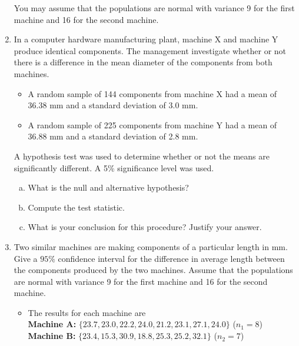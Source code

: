 \documentclass[]{article}
\begin{document}
\begin{enumerate}
You may assume that the populations are normal with variance 9 for the first machine and 16 for
the second machine.

\item 
In a computer hardware manufacturing plant, machine X and machine Y
produce identical components. The management investigate whether or
not there is a difference in the mean diameter of the components from
both machines.
\begin{itemize}
\item A random sample of 144 components from machine X had a mean of
36.38 mm and a standard deviation of 3.0 mm.
\item  A random sample of 225 components from machine Y had a mean of
36.88 mm and a standard deviation of 2.8 mm.
\end{itemize}
A hypothesis test was used to determine whether or not the means are
significantly different. A 5\% significance level was used.
\begin{enumerate}[(a)]
\item What is the null and alternative hypothesis?
\item Compute the test statistic.
\item What is your conclusion for this procedure? Justify your
answer.
\end{enumerate}

	\item Two similar machines are making components of a particular length
	in mm. Give a $95\%$ confidence interval for the difference in average length between
	the components produced by the two machines. Assume that the populations are normal
	with variance 9 for the first machine and 16 for the second machine.
	\begin{itemize}
	\item The results for each machine are\\ \bigskip
	\textbf{Machine A:} $\{ 23.7, 23.0, 22.2, 24.0, 21.2, 23.1, 27.1, 24.0 \}   $ ($n_1= 8$)\\ \bigskip
	\textbf{Machine B:} $\{23.4, 15.3, 30.9, 18.8, 25.3, 25.2, 32.1\}$  ($n_2=7$) \\
\end{itemize}



\end{enumerate}
\end{document}
